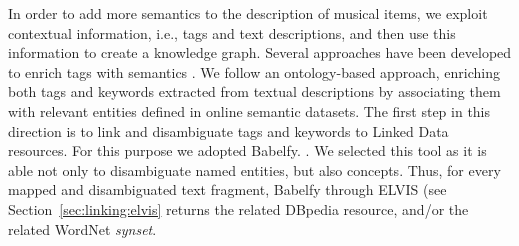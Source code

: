 In order to add more semantics to the description of musical items, we exploit contextual information, i.e., tags and text descriptions, %
and then use this information to create a knowledge graph. 
Several approaches have been developed to enrich tags with semantics \cite{Garcia2012}. We follow an ontology-based approach, enriching both tags and keywords extracted from textual descriptions by associating them with relevant entities defined in online semantic datasets.
The first step in this direction is to link and disambiguate tags and keywords to Linked Data resources. 
For this purpose we adopted Babelfy.%
\cite{Moro2014}. We selected this tool as it is able not only to disambiguate named entities, but also concepts. Thus, for every mapped and disambiguated text fragment, Babelfy through ELVIS (see Section~\ref{sec:linking:elvis} returns the related DBpedia resource, and/or the related WordNet \textit{synset}. 


